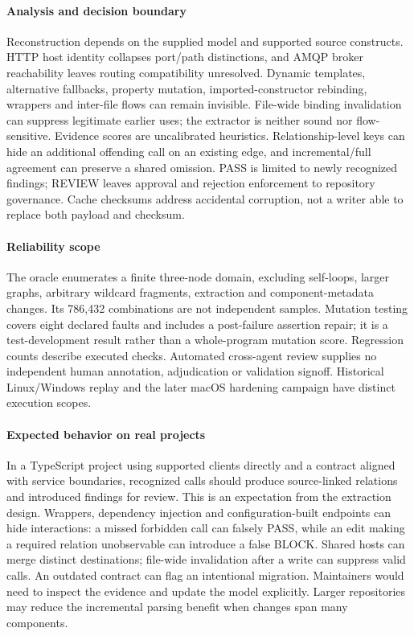 \paragraph{Analysis and decision boundary} Reconstruction depends on the supplied model and supported source constructs. HTTP host identity collapses port/path distinctions, and AMQP broker reachability leaves routing compatibility unresolved. Dynamic templates, alternative fallbacks, property mutation, imported-constructor rebinding, wrappers and inter-file flows can remain invisible. File-wide binding invalidation can suppress legitimate earlier uses; the extractor is neither sound nor flow-sensitive. Evidence scores are uncalibrated heuristics. Relationship-level keys can hide an additional offending call on an existing edge, and incremental/full agreement can preserve a shared omission. PASS is limited to newly recognized findings; REVIEW leaves approval and rejection enforcement to repository governance. Cache checksums address accidental corruption, not a writer able to replace both payload and checksum.

\paragraph{Reliability scope} The oracle enumerates a finite three-node domain, excluding self-loops, larger graphs, arbitrary wildcard fragments, extraction and component-metadata changes. Its 786,432 combinations are not independent samples. Mutation testing covers eight declared faults and includes a post-failure assertion repair; it is a test-development result rather than a whole-program mutation score. Regression counts describe executed checks. Automated cross-agent review supplies no independent human annotation, adjudication or validation signoff. Historical Linux/Windows replay and the later macOS hardening campaign have distinct execution scopes.

\paragraph{Expected behavior on real projects} In a TypeScript project using supported clients directly and a contract aligned with service boundaries, recognized calls should produce source-linked relations and introduced findings for review. This is an expectation from the extraction design. Wrappers, dependency injection and configuration-built endpoints can hide interactions: a missed forbidden call can falsely PASS, while an edit making a required relation unobservable can introduce a false BLOCK. Shared hosts can merge distinct destinations; file-wide invalidation after a write can suppress valid calls. An outdated contract can flag an intentional migration. Maintainers would need to inspect the evidence and update the model explicitly. Larger repositories may reduce the incremental parsing benefit when changes span many components.

